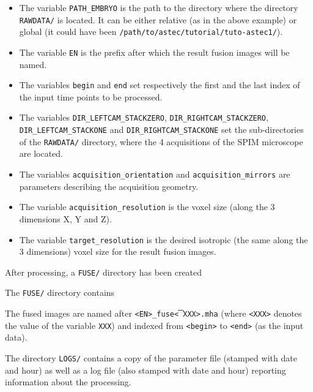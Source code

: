 \begin{itemize}
  \itemsep -0.5ex
  \item The variable \texttt{PATH\_EMBRYO} is the path to the directory where
    the directory \texttt{RAWDATA/} is located. It can be either relative (as in the
    above example) or
    global (it could have been \texttt{/path/to/astec/tutorial/tuto-astec1/}).
  \item The variable \texttt{EN} is the prefix after which the result fusion images
    will be named. 
  \item The variables \texttt{begin} and \texttt{end} set respectively the
    first and the last index of the input time points to be processed.
  \item The variables \texttt{DIR\_LEFTCAM\_STACKZERO}, \texttt{DIR\_RIGHTCAM\_STACKZERO}, \texttt{DIR\_LEFTCAM\_STACKONE} and \texttt{DIR\_RIGHTCAM\_STACKONE} set the sub-directories of the \texttt{RAWDATA/} directory, where the 4 acquisitions of the SPIM microscope are located.
  \item The variables \texttt{acquisition\_orientation} and \texttt{acquisition\_mirrors} are parameters
    describing the acquisition geometry.
  \item The variable \texttt{acquisition\_resolution} is the voxel size (along the 3
    dimensions X, Y and Z).
  \item The variable \texttt{target\_resolution} is the desired isotropic (the
    same along the 3 dimensions) voxel size for the result fusion images.
\end{itemize}

After processing, a \texttt{FUSE/} directory has been created

\mbox{}
\mbox{}

The \texttt{FUSE/} directory contains 
\mbox{}
\mbox{}

The fused images are named after \texttt{<EN>\_fuse\t<XXX>.mha} (where \texttt{<XXX>}
denotes the value of the variable \texttt{XXX}) and indexed from
\texttt{<begin>} to \texttt{<end>} (as the input data).

The directory \texttt{LOGS/} contains
a copy of the parameter file (stamped with date and hour) as well as a
log file (also stamped with date and hour) reporting information about
the processing.



